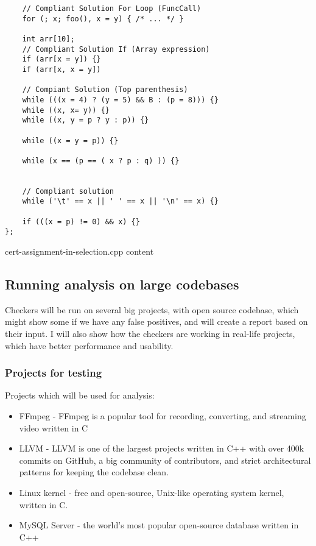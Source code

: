 \begin{code}
\begin{verbatim}
    // Compliant Solution For Loop (FuncCall)
    for (; x; foo(), x = y) { /* ... */ }

    int arr[10];
    // Compliant Solution If (Array expression)
    if (arr[x = y]) {}
    if (arr[x, x = y])

    // Compiant Solution (Top parenthesis)
    while (((x = 4) ? (y = 5) && B : (p = 8))) {}
    while ((x, x= y)) {}
    while ((x, y = p ? y : p)) {}

    while ((x = y = p)) {}

    while (x == (p == ( x ? p : q) )) {}


    // Compliant solution
    while ('\t' == x || ' ' == x || '\n' == x) {}

    if (((x = p) != 0) && x) {}
};
\end{verbatim}
\caption{cert-assignment-in-selection.cpp content}
\end{code}


\subsection{Running analysis on large codebases}

Checkers will be run on several big projects, with open source codebase, which might show some if we have any false positives, and will create a report based on their input. I will also show how the checkers are working in real-life projects, which have better performance and usability.

\subsubsection{Projects for testing}
Projects which will be used for analysis:

\begin{itemize}
    \item FFmpeg - FFmpeg is a popular tool for recording, converting, and streaming video written in C
    \item LLVM - LLVM is one of the largest projects written in C++ with over 400k commits on GitHub, a big community of contributors, and strict architectural patterns for keeping the codebase clean.  
    \item Linux kernel - free and open-source, Unix-like operating system kernel, written in C. 
    \item MySQL Server - the world's most popular open-source database written in C++
\end{itemize}

